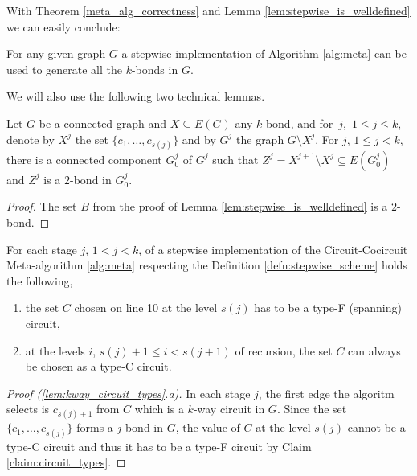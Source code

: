 With Theorem \ref{meta_alg_correctness} and Lemma \ref{lem:stepwise_is_welldefined} we can easily conclude:

\begin{thm}
	\label{thm:stepwise_impl_correctness}
	For any given graph $G$ a stepwise implementation of Algorithm \ref{alg:meta} can be used to generate all the $k$-bonds in $G$.
\end{thm}

We will also use the following two technical lemmas.

\begin{lem}
	\label{stepwise_2bond}
	Let $G$ be a connected graph and $X \subseteq E(G)$ any $k$-bond, and for~$j$,~$1 \leq j \leq k$, denote by $X^j$ the set $\{c_1,\ldots,c_{s(j)}\}$ and by $G^j$ the graph $G \setminus X^{j}$. For $j$, $1 \leq j < k$, there is a connected component $G_0^j$ of $G^j$ such that $Z^j = X^{j+1} \setminus X^{j} \subseteq E(G_0^j)$ and $Z^j$ is a $2$-bond in $G_0^j$.
\end{lem}

\begin{proof}
	The set $B$ from the proof of Lemma \ref{lem:stepwise_is_welldefined} is a $2$-bond.
\end{proof}


\begin{lem}
	\label{lem:kway_circuit_types}
	For each stage $j$, $1 < j < k$, of a stepwise implementation of the Circuit-Cocircuit Meta-algorithm \ref{alg:meta} respecting the Definition \ref{defn:stepwise_scheme} holds the following,

	\begin{enumerate}[label=\alph*.]
		\item the set $C$ chosen on line 10 at the level $s(j)$ has to be a type-F (spanning) circuit,
		\item at the levels $i$, $s(j)+1 \leq i < s(j+1)$ of recursion, the set $C$ can always be chosen as a type-C circuit.
	\end{enumerate}
\end{lem}

\begin{proof}[Proof (\ref{lem:kway_circuit_types}.a)]
	In each stage $j$, the first edge the algoritm selects is $c_{s(j)+1}$ from $C$ which is a $k$-way circuit in $G$. Since the set $\{c_1,\ldots,c_{s(j)}\}$ forms a $j$-bond in $G$, the value of $C$ at the level $s(j)$ cannot be a type-C circuit and thus it has to be a type-F circuit by Claim \ref{claim:circuit_types}.
\end{proof}

